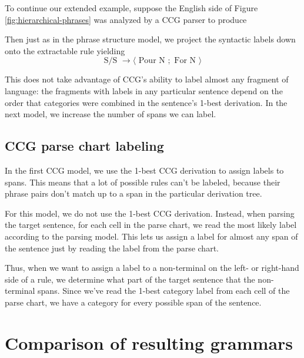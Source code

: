 \documentclass{article}
\begin{document}
To continue our extended example, suppose the English side of Figure \ref{fig:hierarchical-phrases} was analyzed by a CCG parser to produce
\begin{center}
\end{center}
Then just as in the phrase structure model, we project the syntactic labels down onto the extractable rule yielding
\begin{equation}
\textrm{S/S } \to \langle \textrm{ Pour N }; \textrm{ For N } \rangle
\end{equation}

This does not take advantage of CCG's ability to label almost any fragment of language: the fragments with labels in any particular sentence depend on the order that categories were combined in the sentence's 1-best derivation. In the next model, we increase the number of spans we can label.

\subsection{CCG parse chart labeling}

In the first CCG model, we use the 1-best CCG derivation to assign labels to spans. This means that a lot of possible rules can't be labeled, because their phrase pairs don't match up to a span in the particular derivation tree.

For this model, we do not use the 1-best CCG derivation. Instead, when parsing the target sentence, for each cell in the parse chart, we read the most likely label according to the parsing model. This lets us assign a label for almost any span of the sentence just by reading the label from the parse chart.

Thus, when we want to assign a label to a non-terminal on the left- or right-hand side of a rule, we determine what part of the target sentence that the non-terminal spans. Since we've read the 1-best category label from each cell of the parse chart, we have a category for every possible span of the sentence.

\section{Comparison of resulting grammars}
\label{sec:comparison}
\end{document}
